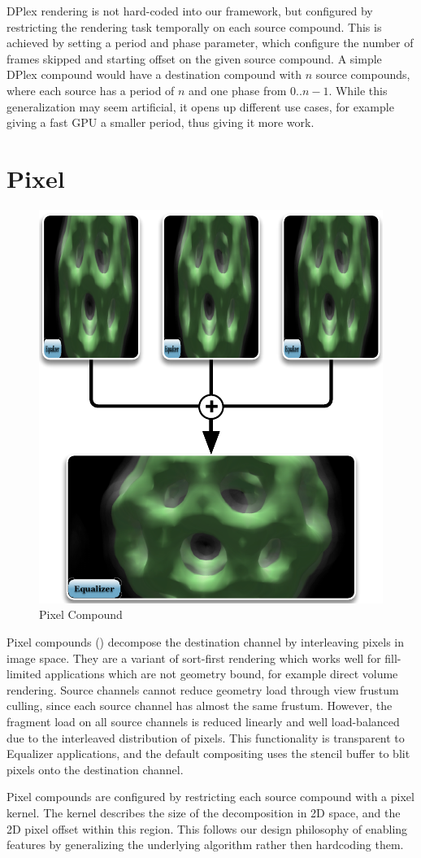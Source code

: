 DPlex rendering is not hard-coded into our framework, but configured by
restricting the rendering task temporally on each source compound. This is
achieved by setting a \textsf{period} and \textsf{phase} parameter, which
configure the number of frames skipped and starting offset on the given source
compound. A simple DPlex compound would have a destination compound with $n$
source compounds, where each source has a period of $n$ and one phase from
$0..n-1$. While this generalization may seem artificial, it opens up different
use cases, for example giving a fast GPU a smaller period, thus giving it more
work.

\section{Pixel}

\begin{figure}
 \includegraphics[width=.382\textwidth]{images/Pixel}
 {\caption{\label{fPixel}Pixel Compound}}
\end{figure}

Pixel compounds () decompose the destination channel by interleaving
pixels in image space. They are a variant of sort-first rendering which works
well for fill-limited applications which are not geometry bound, for example
direct volume rendering. Source channels cannot reduce geometry load through
view frustum culling, since each source channel has almost the same frustum.
However, the fragment load on all source channels is reduced linearly and well
load-balanced due to the interleaved distribution of pixels. This functionality
is transparent to \textsf{Equalizer} applications, and the default compositing
uses the stencil buffer to blit pixels onto the destination channel.

Pixel compounds are configured by restricting each source compound with a pixel
kernel. The kernel describes the size of the decomposition in 2D space, and the
2D pixel offset within this region. This follows our design philosophy of
enabling features by generalizing the underlying algorithm rather then
hardcoding them.

